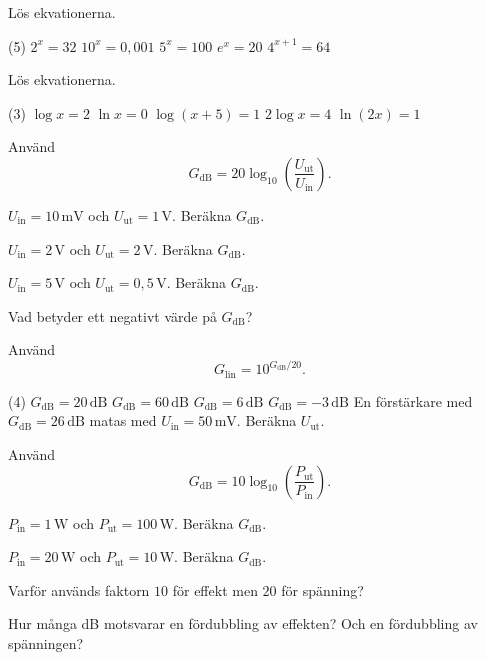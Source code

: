 Lös ekvationerna.
\begin{delar}(5)
  \task $2^x = 32$
  \task $10^x = 0{,}001$
  \task $5^x = 100$
  \task $e^x = 20$
  \task $4^{x+1} = 64$
\end{delar}

Lös ekvationerna.
\begin{delar}(3)
  \task $\log x = 2$
  \task $\ln x = 0$
  \task $\log(x + 5) = 1$
  \task $2\log x = 4$
  \task $\ln(2x) = 1$
\end{delar}

Använd
\[
  G_{\text{dB}} = 20\log_{10}\left(\frac{U_{\text{ut}}}{U_{\text{in}}}\right).
\]
\begin{parts}
  \item $U_{\text{in}} = 10\,\text{mV}$ och $U_{\text{ut}} = 1\,\text{V}$. Beräkna
    $G_{\text{dB}}$.
  \item $U_{\text{in}} = 2\,\text{V}$ och $U_{\text{ut}} = 2\,\text{V}$. Beräkna $G_{\text{dB}}$.
  \item $U_{\text{in}} = 5\,\text{V}$ och $U_{\text{ut}} = 0{,}5\,\text{V}$. Beräkna
    $G_{\text{dB}}$.
  \item Vad betyder ett negativt värde på $G_{\text{dB}}$?
\end{parts}

Använd
\[
  G_{\text{lin}} = 10^{G_{\text{dB}}/20}.
\]
\begin{delar}(4)
  \task $G_{\text{dB}} = 20\,\text{dB}$
  \task $G_{\text{dB}} = 60\,\text{dB}$
  \task $G_{\text{dB}} = 6\,\text{dB}$
  \task $G_{\text{dB}} = -3\,\text{dB}$
  \task* En förstärkare med $G_{\text{dB}} = 26\,\text{dB}$ matas med
    $U_{\text{in}} = 50\,\text{mV}$. Beräkna $U_{\text{ut}}$.
\end{delar}

Använd
\[
  G_{\text{dB}} = 10\log_{10}\left(\frac{P_{\text{ut}}}{P_{\text{in}}}\right).
\]
\begin{parts}
  \item $P_{\text{in}} = 1\,\text{W}$ och $P_{\text{ut}} = 100\,\text{W}$. Beräkna
    $G_{\text{dB}}$.
  \item $P_{\text{in}} = 20\,\text{W}$ och $P_{\text{ut}} = 10\,\text{W}$. Beräkna
    $G_{\text{dB}}$.
  \item Varför används faktorn $10$ för effekt men $20$ för spänning?
  \item Hur många dB motsvarar en fördubbling av effekten? Och en fördubbling av spänningen?
\end{parts}

